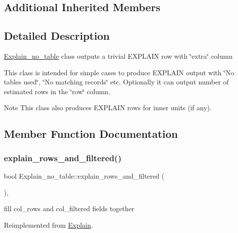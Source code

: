 \subsection*{Additional Inherited Members}


\subsection{Detailed Description}
\mbox{\hyperlink{classExplain__no__table}{Explain\+\_\+no\+\_\+table}} class outputs a trivial E\+X\+P\+L\+A\+IN row with \char`\"{}extra\char`\"{} column

This class is intended for simple cases to produce E\+X\+P\+L\+A\+IN output with \char`\"{}\+No tables used\char`\"{}, \char`\"{}\+No matching records\char`\"{} etc. Optionally it can output number of estimated rows in the \char`\"{}row\char`\"{} column.

\begin{DoxyNote}{Note}
This class also produces E\+X\+P\+L\+A\+IN rows for inner units (if any). 
\end{DoxyNote}


\subsection{Member Function Documentation}
\mbox{\label{classExplain__no__table_a6713209630b904160dfc00bac9841370}} 
\subsubsection{\texorpdfstring{explain\+\_\+rows\+\_\+and\+\_\+filtered()}{explain\_rows\_and\_filtered()}}
{\footnotesize\ttfamily bool Explain\+\_\+no\+\_\+table\+::explain\+\_\+rows\+\_\+and\+\_\+filtered (\begin{DoxyParamCaption}{ }\end{DoxyParamCaption})\hspace{0.3cm}{\ttfamily [protected]}, {\ttfamily [virtual]}}

fill col\+\_\+rows and col\+\_\+filtered fields together 

Reimplemented from \mbox{\hyperlink{classExplain_a1c2766929ff005124f8f14ce33e15f34}{Explain}}.

